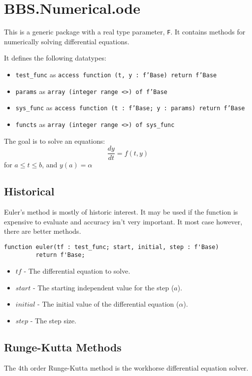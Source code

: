 \documentclass[10pt, openany]{book}
\newcommand{\datatype}[1]{\texttt{#1}}
\begin{document}
\section{BBS.Numerical.ode}
This is a generic package with a real type parameter, \datatype{F}.  It contains methods for numerically solving differential equations.

It defines the following datatypes:
\begin{itemize}
   \item \datatype{test\_func} as \datatype{access function (t, y : f'Base) return f'Base}
   \item \datatype{params} as \datatype{array (integer range <>) of f'Base}
   \item \datatype{sys\_func} as \datatype{access function (t : f'Base; y : params) return f'Base}
   \item \datatype{functs} as \datatype{array (integer range <>) of sys\_func}
\end{itemize}

The goal is to solve an equations:
\begin{displaymath}
  \frac{dy}{dt} = f(t, y)
\end{displaymath}
 for $a\leq t\leq b$, and $y(a) = \alpha$
 
\subsection{Historical}
Euler's method is mostly of historic interest.  It may be used if the function is expensive to evaluate and accuracy isn't very important.  It most case however, there are better methods.

\begin{lstlisting}
function euler(tf : test_func; start, initial, step : f'Base)
         return f'Base;
\end{lstlisting}
\begin{itemize}
  \item $tf$ - The differential equation to solve.
  \item $start$ - The starting independent value for the step ($a$).
  \item $initial$ - The initial value of the differential equation ($\alpha$).
  \item $step$ - The step size.
\end{itemize}

\subsection{Runge-Kutta Methods}
The 4th order Runge-Kutta method is the workhorse differential equation solver.
\end{document}
